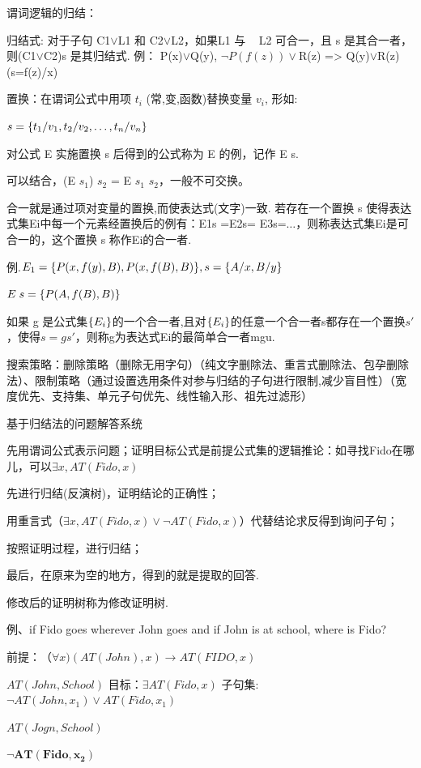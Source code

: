 \documentclass[twocolumn,zihao=5,linespread=1,heading=false,autoindent=0pt]{ctexart}
\DeclarePairedDelimiter{\set}{\{}{\}}
\theoremstyle{exampstyle} \newtheorem{definition}{定义}[section]
\theoremstyle{exampstyle} \newtheorem{example}{例}[section]
\theoremstyle{exampstyle} \newtheorem{theorem}{定理}[section]
\theoremstyle{exampstyle} \newtheorem{lemma}{引理}[section]
\theoremstyle{exampstyle} \newtheorem{myproof}{证明}[section]
\begin{document}
谓词逻辑的归结：

归结式: 对于子句 C1$\lor$L1 和 C2$\lor$L2，如果L1 与 ~ L2 可合一，且 s 是其合一者，则(C1$\lor$C2)s 是其归结式.
例： P(x)$\lor$Q(y), $\lnot P(f(z)) \lor$R(z)
		   => Q(y)$\lor$R(z)      (s=f(z)/x)


置换：在谓词公式中用项 $t_i$ (常,变,函数)替换变量 $v_i$, 形如: 

$s = \set{t_1/v_1, t_2/v_2, \dots, t_n/v_n}$

对公式 E 实施置换 s 后得到的公式称为 E 的例，记作 E s.

可以结合，(E $s_1$) $s_2$  = E $s_1$ $s_2$，一般不可交换。

合一就是通过项对变量的置换,而使表达式(文字)一致. 若存在一个置换 s 使得表达式集{Ei}中每一个元素经置换后的例有：E1s =E2s= E3s=$\dots$，则称表达式集{Ei}是可合一的，这个置换 s 称作{Ei}的合一者.

例.$E_1 = \set{P(x, f(y), B), P(x, f(B), B)}, s = \set{A/x, B/y}$

$E\;s = \set{{P(A, f(B), B)}}$

如果 g 是公式集$\set{E_i}$的一个合一者,且对$\set{E_i}$的任意一个合一者s都存在一个置换$s'$，使得$s = g s'$，则称g为表达式{Ei}的最简单合一者mgu.

搜索策略：删除策略（删除无用字句）（纯文字删除法、重言式删除法、包孕删除法）、限制策略（通过设置选用条件对参与归结的子句进行限制,减少盲目性）（宽度优先、支持集、单元子句优先、线性输入形、祖先过滤形）

基于归结法的问题解答系统

先用谓词公式表示问题；证明目标公式是前提公式集的逻辑推论：如寻找Fido在哪儿，可以$\exists x, AT(Fido, x)$

先进行归结(反演树)，证明结论的正确性；

用重言式（$\exists x, AT(Fido, x) \lor \lnot AT(Fido, x)$）代替结论求反得到询问子句；

按照证明过程，进行归结；

最后，在原来为空的地方，得到的就是提取的回答.

修改后的证明树称为修改证明树.

例、if  Fido goes wherever John goes and if John is at school, where is Fido?

\begin{outline}[cenumerate]
    \1 前提：$（\forall x)(AT(John), x) \to AT(FIDO, x)$
        
        $AT(John, School)$
    \1 目标：$\exists AT(Fido, x)$
    \1 子句集: $\lnot AT(John, x_1) \lor AT(Fido, x_1)$%

        $AT(Jogn, School)$

        $\bm{\lnot AT(Fido, x_2)}$
\end{outline}
\end{document}
